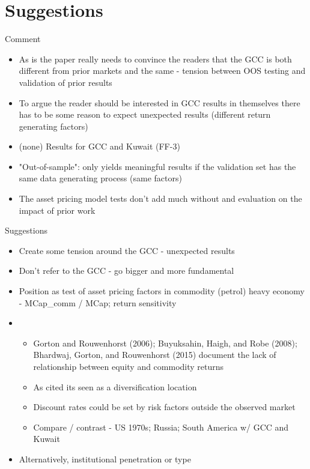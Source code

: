 \documentclass[xcolor=table]{beamer}
\begin{document}
\section{Suggestions}

\begin{frame}{Comment}
\begin{itemize}[<+->]
	\item As is the paper really needs to convince the readers that the GCC is both different from prior markets and the same - tension between OOS testing and validation of prior results
	\item To argue the reader should be interested in GCC results in themselves there has to be some reason to expect unexpected results (different return generating factors)
	\item (none) Results for GCC and Kuwait (FF-3)
	\item "Out-of-sample": only yields meaningful results if the validation set has the same data generating process (same factors)
	\item The asset pricing model tests don't add much without and evaluation on the impact of prior work
\end{itemize}
\end{frame}

\begin{frame}{Suggestions}
	\begin{itemize}[<+->]
	\item Create some tension around the GCC - unexpected results
	\item Don't refer to the GCC - go bigger and more fundamental
	\item Position as test of asset pricing factors in commodity (petrol) heavy economy - MCap\_comm / MCap; return sensitivity
	\item \begin{itemize}
		\item Gorton and Rouwenhorst (2006); Buyuksahin, Haigh, and Robe (2008); Bhardwaj, Gorton, and Rouwenhorst (2015) document the lack of relationship between equity and commodity returns
		\item As cited its seen as a diversification location
		\item Discount rates could be set by risk factors outside the observed market
		\item Compare / contrast - US 1970s; Russia; South America w/ GCC and Kuwait
	\end{itemize} 
	\item Alternatively, institutional penetration or type
\end{itemize}
\end{frame}
\end{document}
